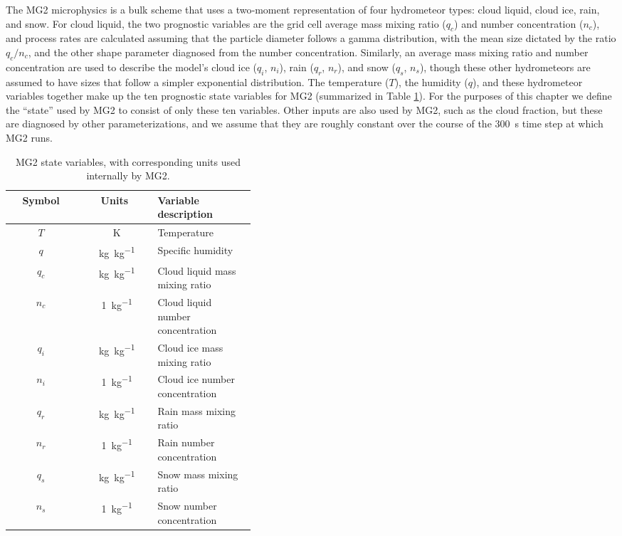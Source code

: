 \documentclass [11pt, proquest] {uwthesis}[2020/02/24]
\begin{document}
The MG2 microphysics is a bulk scheme that uses a two‐moment representation of four hydrometeor types: cloud liquid, cloud ice, rain, and snow. For cloud liquid, the two prognostic variables are the grid cell average mass mixing ratio ($q_c$) and number concentration ($n_c$), and process rates are calculated assuming that the particle diameter follows a gamma distribution, with the mean size dictated by the ratio $q_c/n_c$, and the other shape parameter diagnosed from the number concentration. Similarly, an average mass mixing ratio and number concentration are used to describe the model's cloud ice ($q_i$, $n_i$), rain ($q_r$, $n_r$), and snow ($q_s$, $n_s$), though these other hydrometeors are assumed to have sizes that follow a simpler exponential distribution. The temperature ($T$), the humidity ($q$), and these hydrometeor variables together make up the ten prognostic state variables for MG2 (summarized in Table \ref{tab:variables}). For the purposes of this chapter we define the ``state'' used by MG2 to consist of only these ten variables. Other inputs are also used by MG2, such as the cloud fraction, but these are diagnosed by other parameterizations, and we assume that they are roughly constant over the course of the \SI{300}{\second} time step at which MG2 runs.

\begin{table}
  \centering
  \begin{tabular}{|c|c|p{0.4\linewidth}|}
    \hline
    Symbol & Units & Variable description \\
    \hline
    $T$ & \SI{}{\kelvin} & Temperature \\
    \hline
    $q$ & \SI{}{\kilo\gram\per\kilo\gram} & Specific humidity \\
    \hline
    $q_c$ & \SI{}{\kilo\gram\per\kilo\gram} & Cloud liquid mass mixing ratio \\
    \hline
    $n_c$ & \SI{}{1\per\kilo\gram} & Cloud liquid number concentration \\
    \hline
    $q_i$ & \SI{}{\kilo\gram\per\kilo\gram} & Cloud ice mass mixing ratio \\
    \hline
    $n_i$ & \SI{}{1\per\kilo\gram} & Cloud ice number concentration \\
    \hline
    $q_r$ & \SI{}{\kilo\gram\per\kilo\gram} & Rain mass mixing ratio \\
    \hline
    $n_r$ & \SI{}{1\per\kilo\gram} & Rain number concentration \\
    \hline
    $q_s$ & \SI{}{\kilo\gram\per\kilo\gram} & Snow mass mixing ratio \\
    \hline
    $n_s$ & \SI{}{1\per\kilo\gram} & Snow number concentration \\
    \hline
  \end{tabular}
  \caption{MG2 state variables, with corresponding units used internally by MG2.}
  \label{tab:variables}
\end{table}
\end{document}
